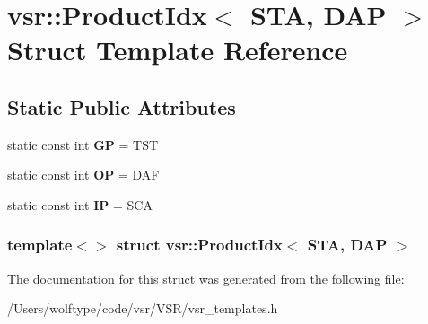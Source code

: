 \hypertarget{structvsr_1_1_product_idx_3_01_s_t_a_00_01_d_a_p_01_4}{\section{vsr\-:\-:Product\-Idx$<$ S\-T\-A, D\-A\-P $>$ Struct Template Reference}
\label{structvsr_1_1_product_idx_3_01_s_t_a_00_01_d_a_p_01_4}
}
\subsection*{Static Public Attributes}
\begin{DoxyCompactItemize}
\item 
\hypertarget{structvsr_1_1_product_idx_3_01_s_t_a_00_01_d_a_p_01_4_a4824833b055f16fb8d3cbadce4f60f4d}{static const int {\bfseries G\-P} = T\-S\-T}\label{structvsr_1_1_product_idx_3_01_s_t_a_00_01_d_a_p_01_4_a4824833b055f16fb8d3cbadce4f60f4d}

\item 
\hypertarget{structvsr_1_1_product_idx_3_01_s_t_a_00_01_d_a_p_01_4_a6af6baeae3424177f5bcfe30781faea7}{static const int {\bfseries O\-P} = D\-A\-F}\label{structvsr_1_1_product_idx_3_01_s_t_a_00_01_d_a_p_01_4_a6af6baeae3424177f5bcfe30781faea7}

\item 
\hypertarget{structvsr_1_1_product_idx_3_01_s_t_a_00_01_d_a_p_01_4_a7b682bf3b694f10c31ea9ffde2b2a6b5}{static const int {\bfseries I\-P} = S\-C\-A}\label{structvsr_1_1_product_idx_3_01_s_t_a_00_01_d_a_p_01_4_a7b682bf3b694f10c31ea9ffde2b2a6b5}

\end{DoxyCompactItemize}
\subsubsection*{template$<$$>$ struct vsr\-::\-Product\-Idx$<$ S\-T\-A, D\-A\-P $>$}



The documentation for this struct was generated from the following file\-:\begin{DoxyCompactItemize}
\item 
/\-Users/wolftype/code/vsr/\-V\-S\-R/vsr\-\_\-templates.\-h\end{DoxyCompactItemize}
